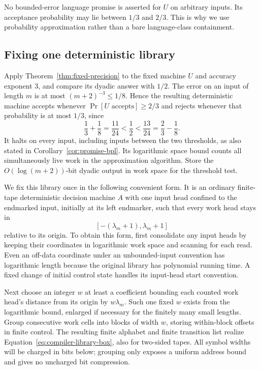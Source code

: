 No bounded-error language promise is asserted for $U$ on arbitrary
inputs.  Its acceptance probability may lie between $1/3$ and $2/3$.
This is why we use probability approximation rather than a bare
language-class containment.

\subsection{Fixing one deterministic library}
\label{subsec:compiler-library}

Apply Theorem~\ref{thm:fixed-precision} to the fixed machine $U$ and
accuracy exponent $3$, and compare its dyadic answer with $1/2$.
The error on an input of length $m$ is at most
$(m+2)^{-3}\le1/8$.  Hence the resulting deterministic machine accepts
whenever $\Pr[U\text{ accepts}]\ge2/3$ and rejects whenever that
probability is at most $1/3$, since
\[
 \frac13+\frac18=\frac{11}{24}<\frac12
   <\frac{13}{24}=\frac23-\frac18.
\]
It halts on every input, including inputs between the two thresholds,
as also stated in Corollary~\ref{cor:promise-bpl}.  Its logarithmic
space bound counts all simultaneously live work in the approximation
algorithm.  Store the $O(\log(m+2))$-bit dyadic output in work space
for the threshold test.

We fix this library once in the following convenient form.  It is an
ordinary finite-tape deterministic decision machine $A$ with one input
head confined to the endmarked input, initially at its left endmarker,
such that every work head stays in
\begin{equation}\label{eq:compiler-library-box}
 [-(\lambda_m+1),\lambda_m+1]
\end{equation}
relative to its origin.  To obtain this form, first consolidate any
input heads by keeping their coordinates in logarithmic work space
and scanning for each read.  Even an off-data coordinate under an
unbounded-input convention has logarithmic length because the original
library has polynomial running time.  A fixed change of initial control
state handles its input-head start convention.

Next choose an integer $w$ at least a coefficient bounding each counted
work head's distance from its origin by $w\lambda_m$.  Such one fixed
$w$ exists from the logarithmic bound, enlarged if necessary for the
finitely many small lengths.  Group consecutive work cells into blocks
of width $w$, storing within-block offsets in finite control.  The
resulting finite alphabet and finite transition list realize
Equation~\eqref{eq:compiler-library-box}, also for two-sided tapes.
All symbol widths will be charged in bits below; grouping only exposes
a uniform address bound and gives no uncharged bit compression.

